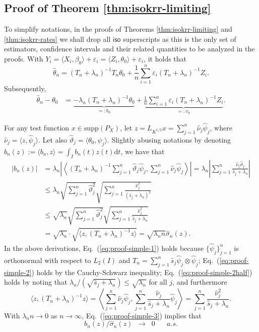\documentclass[11pt,a4paper]{article}
\renewcommand{\hat}{\widehat}
\theoremstyle{definition}
\theoremstyle{plain}
\theoremstyle{remark}
\newcommand{\supp}{\mathrm{supp}}
\newcommand{\ud}{\mathrm d}
\newcommand{\iso}{\mathsf{iso}}
\begin{document}
\subsection{Proof of Theorem \ref{thm:isokrr-limiting}}

To simplify notations, in the proofs of Theorems \ref{thm:isokrr-limiting} and \ref{thm:isokrr-rates} we shall drop all $\iso$ superscripts as this is the only set of estimators, confidence intervals and their related
quantities to be analyzed in the proofs.
With $Y_i=\langle X_i,\beta_0\rangle+\varepsilon_i = \langle Z_i,\theta_0\rangle+\varepsilon_i$, it holds that
$$
\hat\theta_n = (T_n+\lambda_n)^{-1}T_n\theta_0 + \frac{1}{n}\sum_{i=1}^n\varepsilon_i (T_n+\lambda_n)^{-1}Z_i.
$$
Subsequently,
\begin{align}
\hat\theta_n-\theta_0 &= \underbrace{-\lambda_n (T_n+\lambda_n)^{-1}\theta_0}_{=: b_n} + \underbrace{\frac{1}{n}\sum_{i=1}^n\varepsilon_i(T_n+\lambda_n)^{-1}Z_i}_{=:v_n}.
\end{align}

For any test function $x\in\supp(P_X)$, let $z=L_{K^{1/2}}x=\sum_{j=1}^{n}\hat\nu_j\hat\psi_j$, where $\hat\nu_j=\langle z,\hat\psi_j\rangle$.
Let also $\hat\vartheta_j = \langle\theta_0,\hat\psi_j\rangle$.
Slightly abusing notations by denoting $b_n(z) := \langle b_n,z\rangle = \int_I b_n(t)z(t)\ud t$, we have that
\begin{align}
\big|b_n(z)\big| &= \lambda_n\left|\left\langle(T_n+\lambda_n)^{-1}\sum_{j=1}^n\hat\vartheta_j\hat\psi_j, \sum_{j=1}^n\hat\nu_j\hat\psi_j\right\rangle\right|
= \lambda_n \left|\sum_{j=1}^n \frac{\hat\nu_j\hat\vartheta_j}{\hat s_j+\lambda_n}\right|\label{eq:proof-simple-1}\\
&\leq \lambda_n \sqrt{\sum_{j=1}^n\hat\vartheta_j^2}\sqrt{\sum_{j=1}^n\frac{\hat\nu_j^2}{(\hat s_j+\lambda_n)^2}} \label{eq:proof-simple-2}\\
&\leq \sqrt{\lambda_n}\sqrt{\sum_{j=1}^n\hat\vartheta_j^2}\sqrt{\sum_{j=1}^n\frac{\hat\nu_j^2}{\hat s_j+\lambda_n}}\label{eq:proof-simple-2half}\\
&= \sqrt{\lambda_n}\cdot \sqrt{\langle z,(T_n+\lambda_n)^{-1}z\rangle} = \sqrt{\lambda_nn}\hat\sigma_n(z).\label{eq:proof-simple-3}
\end{align}
In the above derivations, Eq.~(\ref{eq:proof-simple-1}) holds because $\{\hat\psi_j\}_{j=1}^n$ is orthonormal with respect to $L_2(I)$ and $T_n=\sum_{j=1}^n\hat s_j\hat\psi_j\otimes\hat\psi_j$;
Eq.~(\ref{eq:proof-simple-2}) holds by the Cauchy-Schwarz inequality;
Eq.~(\ref{eq:proof-simple-2half}) holds by noting that $\lambda_n/(\sqrt{\hat s_j+\lambda_n})\leq\sqrt{\lambda_n}$ for all $j$, and furthermore
$$
\langle z, (T_n+\lambda_n)^{-1}z\rangle = \left\langle\sum_{j=1}^n\hat\nu_j\hat\psi_j, \sum_{j=1}^n\frac{\hat\nu_j}{\hat s_j+\lambda_n}\hat\psi_j\right\rangle = \sum_{j=1}^n\frac{\hat\nu_j^2}{\hat s_j+\lambda_n}.
$$
With $\lambda_n n\to 0$ as $n\to\infty$, Eq.~(\ref{eq:proof-simple-3}) implies that
$$
b_n(z)/\hat\sigma_n(z)\;\;\to\;\;0\;\;\;\;\;\;a.s.
$$
\end{document}
